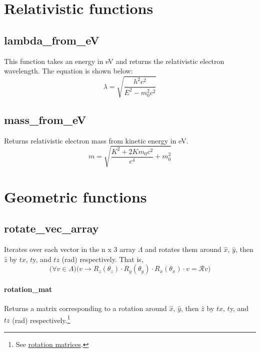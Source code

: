 \documentclass{article}
\begin{document}
	\maketitle
	\tableofcontents
	\newpage
	\section{Relativistic functions}
		\subsection{lambda\_from\_eV}
			This function takes an energy in eV and returns the 	relativistic electron wavelength. The equation is shown below:
			\begin{equation}
				\lambda = \sqrt{\frac{h^2c^2}{E^2-m_0^2 c^2}}
			\end{equation}
		\subsection{mass\_from\_eV}
			Returns relativistic electron mass from kinetic energy in eV.
				\begin{equation}
					m = \sqrt{\frac{K^2+2Km_0c^2}{c^4}+m_0^2}
				\end{equation}
	\section{Geometric functions}
		\subsection{rotate\_vec\_array}
			Iterates over each vector in the n x 3 array $\Lambda$ and rotates them around $\hat{x}$, $\hat{y}$, then $\hat{z}$ by $tx$, $t$y, and $tz$ (rad) respectively.
			That is, 
			\begin{equation}
				\Bigg(\forall v\in \Lambda\Bigg)\Bigg(v\to R_z(\theta_z)\cdot R_y(\theta_y)\cdot R_x(\theta_x) \cdot v = \mathcal{R}v\Bigg)
			\end{equation}
	
		\paragraph{rotation\_mat}
			Returns a matrix corresponding to a rotation around $\hat{x}$, $\hat{y}$, then $\hat{z}$ by $tx$, $t$y, and $tz$ (rad) respectively.\footnote{See  \href{https://en.wikipedia.org/wiki/Rotation\_matrix}{rotation matrices}.}
				
\end{document}

